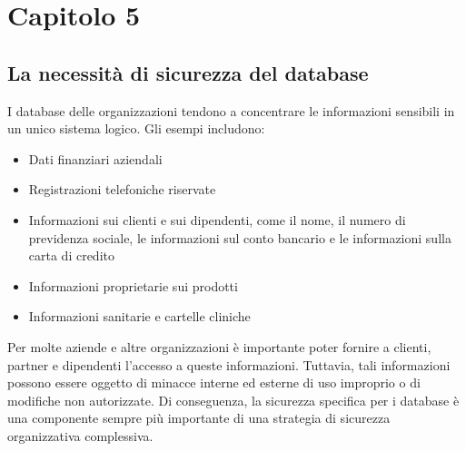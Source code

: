 \chapter*{Capitolo 5}
\section{La necessità di sicurezza del database}
I database delle organizzazioni tendono a concentrare le informazioni sensibili in un unico sistema logico. Gli esempi includono:
\begin{itemize}
    \item Dati finanziari aziendali
    
    \item Registrazioni telefoniche riservate
    
    \item Informazioni sui clienti e sui dipendenti, come il nome, il numero di previdenza sociale, le informazioni sul conto bancario e le informazioni sulla carta di credito
    
    \item Informazioni proprietarie sui prodotti
    
    \item Informazioni sanitarie e cartelle cliniche 
\end{itemize}
Per molte aziende e altre organizzazioni è importante poter fornire a clienti, partner e dipendenti l'accesso a queste informazioni. Tuttavia, tali informazioni possono essere oggetto di minacce interne ed esterne di uso improprio o di modifiche non autorizzate. Di conseguenza, la sicurezza specifica per i database è una componente sempre più importante di una strategia di sicurezza organizzativa complessiva. 

\singlespacing

